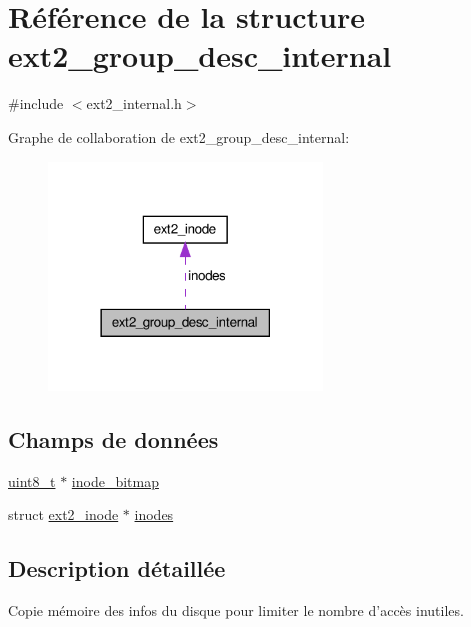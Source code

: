 \hypertarget{structext2__group__desc__internal}{\section{Référence de la structure ext2\+\_\+group\+\_\+desc\+\_\+internal}
\label{structext2__group__desc__internal}
}


{\ttfamily \#include $<$ext2\+\_\+internal.\+h$>$}



Graphe de collaboration de ext2\+\_\+group\+\_\+desc\+\_\+internal\+:\nopagebreak
\begin{figure}[H]
\begin{center}
\leavevmode
\includegraphics[width=206pt]{structext2__group__desc__internal__coll__graph}
\end{center}
\end{figure}
\subsection*{Champs de données}
\begin{DoxyCompactItemize}
\item 
\hyperlink{kernel_2include_2types_8h_aba7bc1797add20fe3efdf37ced1182c5}{uint8\+\_\+t} $\ast$ \hyperlink{structext2__group__desc__internal_a5b3cee6954ef4ed21c238b46d389b9bf}{inode\+\_\+bitmap}
\item 
struct \hyperlink{structext2__inode}{ext2\+\_\+inode} $\ast$ \hyperlink{structext2__group__desc__internal_a690f836bfb2c8de04ae2b1753134f8a7}{inodes}
\end{DoxyCompactItemize}


\subsection{Description détaillée}
Copie mémoire des infos du disque pour limiter le nombre d'accès inutiles. 

